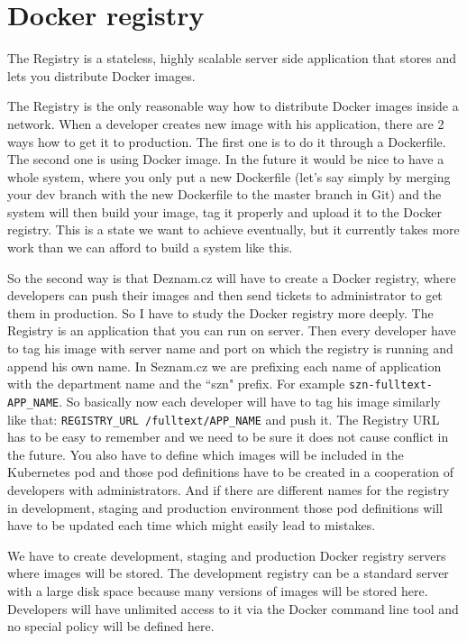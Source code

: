 \chapter{Docker registry}

The Registry is a stateless, highly scalable server side application that stores and lets you distribute Docker images. \cite{docker-registry}

The Registry is the only reasonable way how to distribute Docker images inside a network. When a developer creates new image with his application, there are 2 ways how to get it to production. The first one is to do it through a Dockerfile. The second one is using Docker image. In the future it would be nice to have a whole system, where you only put a new Dockerfile (let’s say simply by merging your dev branch with the new Dockerfile to the master branch in Git) and the system will then build your image, tag it properly and upload it to the Docker registry. This is a state we want to achieve eventually, but it currently takes more work than we can afford to build a system like this.

So the second way is that Deznam.cz will have to create a Docker registry, where developers can push their images and then send tickets to administrator to get them in production. So I have to study the Docker registry more deeply. The Registry is an application that you can run on server. Then every developer have to tag his image with server name and port on which the registry is running and append his own name. In Seznam.cz we are prefixing each name of application with the department name and the ``szn" prefix. For example \lstinline{szn-fulltext-APP_NAME}. So basically now each developer will have to tag his image similarly like that: \lstinline{REGISTRY_URL /fulltext/APP_NAME} and push it. The Registry URL has to be easy to remember and we need to be sure it does not cause conflict in the future. You also have to define which images will be included in the Kubernetes pod and those pod definitions have to be created in a cooperation of developers with administrators. And if there are different names for the registry in development, staging and production environment those pod definitions will have to be updated each time which might easily lead to mistakes.

We have to create development, staging and production Docker registry servers where images will be stored. The development registry can be a standard server with a large disk space because many versions of images will be stored here. Developers will have unlimited access to it via the Docker command line tool and no special policy will be defined here.

